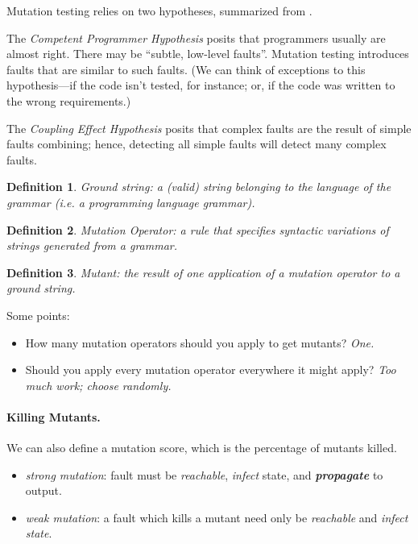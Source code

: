 \documentclass[11pt]{article}
\newtheorem{defn}{Definition}
\begin{document}
Mutation testing relies on two hypotheses, summarized from \cite{delgado-perez18:_evaluat_mutat_testin_nuclear_indus_case_study}.

The \emph{Competent Programmer Hypothesis} posits that programmers usually are almost right.
There may be ``subtle, low-level faults''. Mutation testing introduces faults that
are similar to such faults. (We can think of exceptions to this hypothesis---if
the code isn't tested, for instance; or, if the code was written to the wrong
requirements.)

The \emph{Coupling Effect Hypothesis} posits that complex faults are the result of
simple faults combining; hence, detecting all simple faults will detect many
complex faults.

\begin{defn}
Ground string: a (valid) string belonging to the language of the grammar (i.e. 
a programming language grammar).
\end{defn}

\begin{defn}
Mutation Operator: a rule that specifies syntactic variations of
strings generated from a grammar.
\end{defn}

\begin{defn}
Mutant: the result of one application of a mutation operator to a 
ground string.
\end{defn}

Some points:
\begin{itemize}[noitemsep]
\item How many mutation operators should you apply to get mutants? \emph{One.}
\item Should you apply every mutation operator everywhere it might apply? \emph{Too much work; choose randomly.}
\end{itemize}

\paragraph{Killing Mutants.} 
We can also define a mutation score, which is the percentage of mutants killed.

\begin{itemize}[noitemsep]
\item \emph{strong mutation}: fault must be \emph{reachable},
\emph{infect} state, and \emph{\bf propagate} to output.
\item \emph{weak mutation}: a fault which kills a mutant need only be
\emph{reachable} and \emph{infect state}.
\end{itemize}
\end{document}
